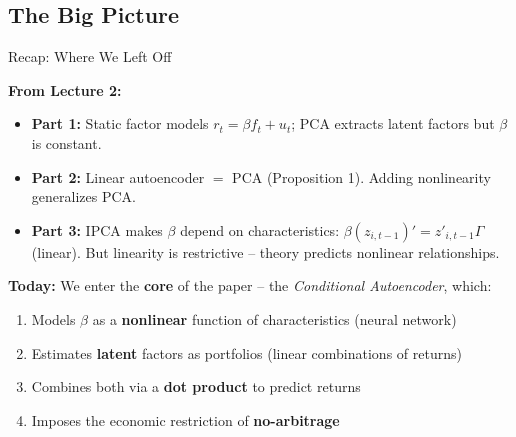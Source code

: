 \documentclass[aspectratio=169]{beamer}
\begin{document}
\subsection{The Big Picture}
%
\begin{frame}{Recap: Where We Left Off}

\textbf{From Lecture 2:}
\begin{itemize}
    \item \textbf{Part 1:} Static factor models $r_t = \beta f_t + u_t$; PCA extracts latent factors but $\beta$ is constant.
    \item \textbf{Part 2:} Linear autoencoder $=$ PCA (Proposition 1). Adding nonlinearity generalizes PCA.
    \item \textbf{Part 3:} IPCA makes $\beta$ depend on characteristics: $\beta(z_{i,t-1})' = z'_{i,t-1}\Gamma$ (linear). But linearity is restrictive -- theory predicts nonlinear relationships.
\end{itemize}

\vspace{0.5em}
\textbf{Today:} We enter the \textbf{core} of the paper -- the \emph{Conditional Autoencoder}, which:
\begin{enumerate}
    \item Models $\beta$ as a \textbf{nonlinear} function of characteristics (neural network)
    \item Estimates \textbf{latent} factors as portfolios (linear combinations of returns)
    \item Combines both via a \textbf{dot product} to predict returns
    \item Imposes the economic restriction of \textbf{no-arbitrage}
\end{enumerate}
\end{frame}
%
%
\end{document}
